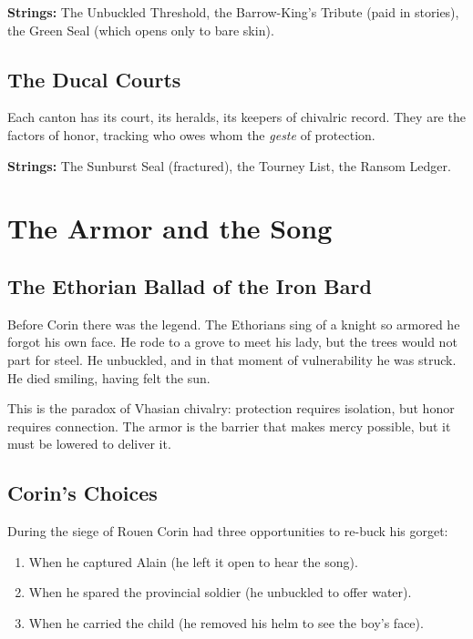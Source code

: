 \documentclass[11pt,twoside]{book}
\begin{document}
\textbf{Strings:} The Unbuckled Threshold, the Barrow-King's Tribute (paid in stories), the Green Seal (which opens only to bare skin).

\section{The Ducal Courts}
Each canton has its court, its heralds, its keepers of chivalric record.  They are the factors of honor, tracking who owes whom the \emph{geste} of protection.

\textbf{Strings:} The Sunburst Seal (fractured), the Tourney List, the Ransom Ledger.

\chapter{The Armor and the Song}\label{ch:story}

\section{The Ethorian Ballad of the Iron Bard}
Before Corin there was the legend.  The Ethorians sing of a knight so armored he forgot his own face.  He rode to a grove to meet his lady, but the trees would not part for steel.  He unbuckled, and in that moment of vulnerability he was struck.  He died smiling, having felt the sun.

This is the paradox of Vhasian chivalry: protection requires isolation, but honor requires connection.  The armor is the barrier that makes mercy possible, but it must be lowered to deliver it.

\section{Corin's Choices}
During the siege of Rouen Corin had three opportunities to re-buck his gorget:

\begin{enumerate}
  \item When he captured Alain (he left it open to hear the song).
  \item When he spared the provincial soldier (he unbuckled to offer water).
  \item When he carried the child (he removed his helm to see the boy's face).
\end{enumerate}
\end{document}
